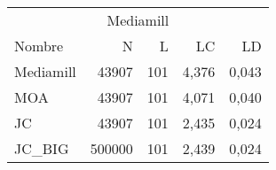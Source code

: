 \begin{tabular}{lrrrr}
	\toprule
	\multicolumn{5}{c}{Mediamill}            \\
	Nombre    & N      & L   & LC    & LD    \\
	\midrule
	Mediamill & 43907  & 101 & 4,376 & 0,043 \\
	MOA       & 43907  & 101 & 4,071 & 0,040 \\
	JC        & 43907  & 101 & 2,435 & 0,024 \\
	JC\_BIG   & 500000 & 101 & 2,439 & 0,024 \\
	\bottomrule
\end{tabular}
